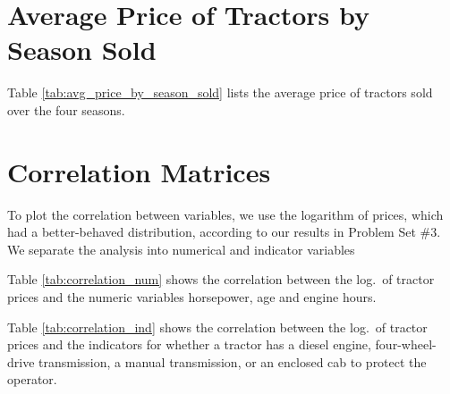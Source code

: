 




\section{Average Price of Tractors by Season Sold}

Table \ref{tab:avg_price_by_season_sold} lists the 
average price of tractors sold
over the four seasons. 







\pagebreak
\section{Correlation Matrices}
To plot the correlation between variables, 
we use the logarithm of prices, which had a better-behaved distribution, 
according to our results in Problem Set \#3.
We separate the analysis into numerical and indicator variables 


Table \ref{tab:correlation_num} shows the correlation 
between the log.~of tractor prices
and the numeric variables horsepower, age and engine hours.





Table \ref{tab:correlation_ind} shows the correlation 
between the log.~of tractor prices
and the indicators for whether a tractor
has a diesel engine, four-wheel-drive transmission, a manual transmission, 
or an enclosed cab to protect the operator. 







% 

